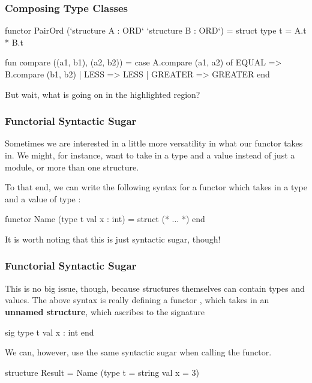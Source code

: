 \documentclass[aspectratio=169]{beamer}
\begin{document}
\begin{frame}[fragile]
  \frametitle{Composing Type Classes}

  \begin{codeblock}
    functor PairOrd (`structure A : ORD`
                     `structure B : ORD`) =
      struct
        type t = A.t * B.t

        fun compare ((a1, b1), (a2, b2)) =
          case A.compare (a1, a2) of
            EQUAL   => B.compare (b1, b2)
          | LESS    => LESS
          | GREATER => GREATER
      end
  \end{codeblock}

  But wait, what is going on in the highlighted region?
\end{frame}

\begin{frame}[fragile]
  \frametitle{Functorial Syntactic Sugar}

  Sometimes we are interested in a little more versatility in what our functor
  takes in. We might, for instance, want to take in a type and a value instead of
  just a module, or more than one structure.

  To that end, we can write the following syntax for a functor which takes in
  a type  and a value  of type :

  \begin{codeblock}
    functor Name (type t 
                  val x : int) =
      struct
        (* ... *)
      end
  \end{codeblock}


  It is worth noting that this is just syntactic sugar, though!
\end{frame}

\begin{frame}[fragile]
  \frametitle{Functorial Syntactic Sugar}
  

  This is no big issue, though, because structures themselves can contain types
  and values. The above syntax is really defining a functor , which
  takes in an \textbf{unnamed structure}, which ascribes to the signature

  \begin{codeblock}
    sig
      type t
      val x : int
    end
  \end{codeblock}

  We can, however, use the same syntactic sugar when calling the functor. 

  \begin{codeblock}
    structure Result = Name (type t = string 
                             val x = 3)
  \end{codeblock}
\end{frame}
\end{document}
